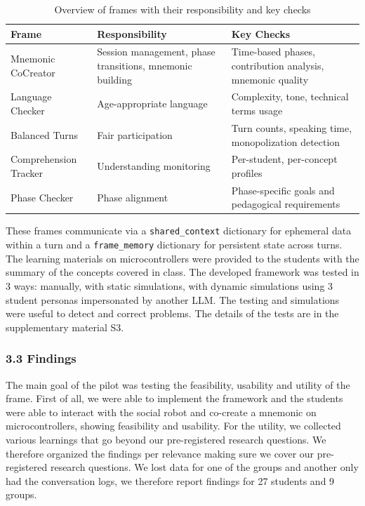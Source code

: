 \documentclass[fleqn,10pt]{wlscirep}
\begin{document}
\begin{table}[ht]
\centering
\begin{tabular}{|l|p{5cm}|p{5cm}|}
\hline
\textbf{Frame} & \textbf{Responsibility} & \textbf{Key Checks} \\
\hline
Mnemonic CoCreator & Session management, phase transitions, mnemonic building & Time-based phases, contribution analysis, mnemonic quality \\
\hline
Language Checker & Age-appropriate language & Complexity, tone, technical terms usage \\
\hline
Balanced Turns & Fair participation & Turn counts, speaking time, monopolization detection \\
\hline
Comprehension Tracker & Understanding monitoring & Per-student, per-concept profiles \\
\hline
Phase Checker & Phase alignment & Phase-specific goals and pedagogical requirements \\
\hline
\end{tabular}
\caption{\label{tbl:frames}Overview of frames with their responsibility and key checks}
\end{table}

These frames communicate via a \texttt{shared\_context} dictionary for ephemeral data within a turn and a \texttt{frame\_memory} dictionary for persistent state across turns. The learning materials on microcontrollers were provided to the students with the summary of the concepts covered in class. The developed framework was tested in 3 ways: manually, with static simulations, with dynamic simulations using 3 student personas impersonated by another LLM. The testing and simulations were useful to detect and correct problems. The details of the tests are in the supplementary material S3.

\subsubsection*{3.3 Findings}

The main goal of the pilot was testing the feasibility, usability and utility of the frame. First of all, we were able to implement the framework and the students were able to interact with the social robot and co-create a mnemonic on microcontrollers, showing feasibility and usability. For the utility, we collected various learnings that go beyond our pre-registered research questions. We therefore organized the findings per relevance making sure we cover our pre-registered research questions. We lost data for one of the groups and another only had the conversation logs, we therefore report findings for 27 students and 9 groups.
\end{document}
